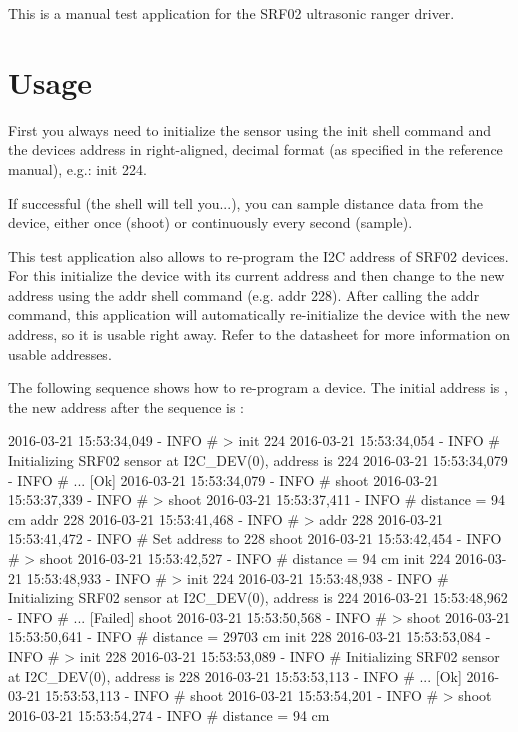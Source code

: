 This is a manual test application for the S\+R\+F02 ultrasonic ranger driver.

\section*{Usage}

First you always need to initialize the sensor using the {\ttfamily init} shell command and the devices address in right-\/aligned, decimal format (as specified in the reference manual), e.\+g.\+: {\ttfamily init 224}.

If successful (the shell will tell you...), you can sample distance data from the device, either once ({\ttfamily shoot}) or continuously every second ({\ttfamily sample}).

This test application also allows to re-\/program the I2C address of S\+R\+F02 devices. For this initialize the device with its current address and then change to the new address using the {\ttfamily addr} shell command (e.\+g. {\ttfamily addr 228}). After calling the {\ttfamily addr} command, this application will automatically re-\/initialize the device with the new address, so it is usable right away. Refer to the datasheet for more information on usable addresses.

The following sequence shows how to re-\/program a device. The initial address is {}, the new address after the sequence is {}\+:


\begin{DoxyCode}
2016-03-21 15:53:34,049 - INFO # > init 224
2016-03-21 15:53:34,054 - INFO # Initializing SRF02 sensor at I2C\_DEV(0), address is 224
2016-03-21 15:53:34,079 - INFO # ... [Ok]
2016-03-21 15:53:34,079 - INFO #
shoot
2016-03-21 15:53:37,339 - INFO # > shoot
2016-03-21 15:53:37,411 - INFO # distance =  94 cm
addr 228
2016-03-21 15:53:41,468 - INFO # > addr 228
2016-03-21 15:53:41,472 - INFO # Set address to 228
shoot
2016-03-21 15:53:42,454 - INFO # > shoot
2016-03-21 15:53:42,527 - INFO # distance =  94 cm
init 224
2016-03-21 15:53:48,933 - INFO # > init 224
2016-03-21 15:53:48,938 - INFO # Initializing SRF02 sensor at I2C\_DEV(0), address is 224
2016-03-21 15:53:48,962 - INFO # ... [Failed]
shoot
2016-03-21 15:53:50,568 - INFO # > shoot
2016-03-21 15:53:50,641 - INFO # distance = 29703 cm
init 228
2016-03-21 15:53:53,084 - INFO # > init 228
2016-03-21 15:53:53,089 - INFO # Initializing SRF02 sensor at I2C\_DEV(0), address is 228
2016-03-21 15:53:53,113 - INFO # ... [Ok]
2016-03-21 15:53:53,113 - INFO #
shoot
2016-03-21 15:53:54,201 - INFO # > shoot
2016-03-21 15:53:54,274 - INFO # distance =  94 cm
\end{DoxyCode}
 